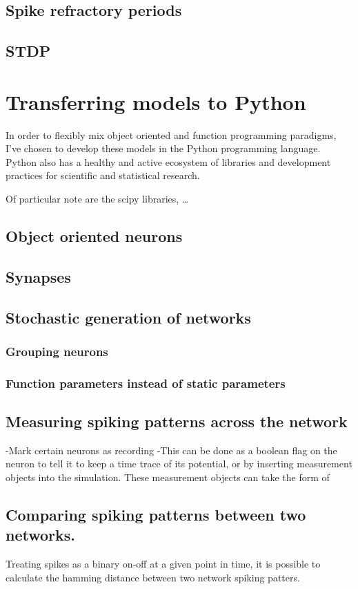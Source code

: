\subsection{Spike refractory periods}

\subsection{STDP}

\section{Transferring models to Python}

In order to flexibly mix
object oriented and function programming paradigms, I've chosen to develop these
models in the Python programming language. Python also has a healthy and active
ecosystem of libraries and development practices for scientific and statistical research.

Of particular note are the scipy libraries, \ldots

\subsection{Object oriented neurons}

\subsection{Synapses}

\subsection{Stochastic generation of networks}

\subsubsection{Grouping neurons}

\subsubsection{Function parameters instead of static parameters}

\subsection{Measuring spiking patterns across the network}

-Mark certain neurons as recording
-This can be done as a boolean flag on the neuron to tell it to keep a time
trace of its potential, or by inserting measurement objects into the simulation.
These measurement objects can take the form of 

\subsection{Comparing spiking patterns between two networks.}

Treating spikes as a binary on-off at a given point in time, it is possible to
calculate the hamming distance between two network spiking patters. 

